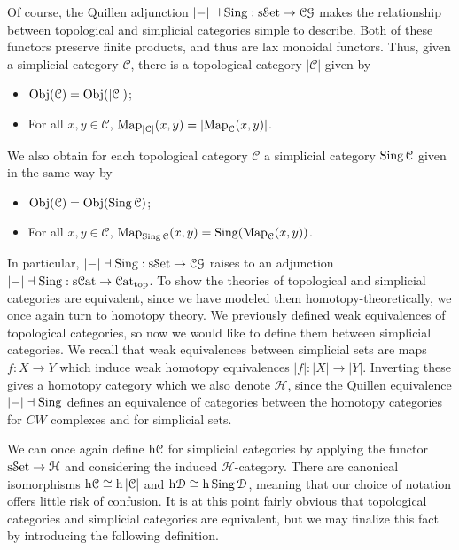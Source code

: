 Of course, the Quillen adjunction $\left| - \right| \dashv\operatorname{Sing} : \mathrm{s}\mathcal{S}\mathrm{et} \to \mathcal{C} \mathcal{G} $ makes the relationship between topological and simplicial categories simple to describe. Both of these functors preserve finite products, and thus are lax monoidal functors. Thus, given a simplicial category $\mathcal{C} $, there is a topological category $\left| \mathcal{C}  \right| $ given by
\begin{itemize}
	\item $\operatorname{Obj}(\mathcal{C} ) =\operatorname{Obj}(\left| \mathcal{C}  \right| ) $;
	\item For all $x,y\in \mathcal{C} $, $\operatorname{Map} _{\left| \mathcal{C}  \right| } (x,y)=\left| \operatorname{Map} _\mathcal{C} (x,y) \right| $.
\end{itemize}
We also obtain for each topological category $\mathcal{C} $ a simplicial category $\operatorname{Sing}\mathcal{C} $ given in the same way by
\begin{itemize}
	\item $\operatorname{Obj}(\mathcal{C} ) =\operatorname{Obj}(\operatorname{Sing} \mathcal{C} ) $;
	\item For all $x,y\in \mathcal{C} $, $\operatorname{Map} _{\operatorname{Sing} \mathcal{C} } (x,y)=\operatorname{Sing}(\operatorname{Map} _\mathcal{C} (x,y))$.
\end{itemize}
In particular, $\left| - \right| \dashv\operatorname{Sing} : \mathrm{s}\mathcal{S}\mathrm{et}  \to \mathcal{C} \mathcal{G} $ raises to an adjunction $\left| - \right| \dashv\operatorname{Sing} : \mathrm{s} \mathcal{C}\mathrm{at}  \to \mathcal{C}\mathrm{at} _{\text{top} } $. To show the theories of topological and simplicial categories are equivalent, since we have modeled them homotopy-theoretically, we once again turn to homotopy theory. We previously defined weak equivalences of topological categories, so now we would like to define them between simplicial categories. We recall that weak equivalences between simplicial sets are maps $f : X \to Y$ which induce weak homotopy equivalences $\left| f \right| : \left| X \right|  \to \left| Y \right| $. Inverting these gives a homotopy category which we also denote $\mathcal{H} $, since the Quillen equivalence $\left| - \right| \dashv\operatorname{Sing}$ defines an equivalence of categories between the homotopy categories for $CW$ complexes and for simplicial sets.

We can once again define $\mathrm{h}\mathcal{C} $ for simplicial categories by applying the functor $\mathrm{s}\mathcal{S}\mathrm{et} \to \mathcal{H} $ and considering the induced $\mathcal{H} $-category. There are canonical isomorphisms $\mathrm{h}\mathcal{C} \cong \mathrm{h}\left| \mathcal{C}  \right| $ and $\mathrm{h} \mathcal{D} \cong \mathrm{h}\operatorname{Sing} \mathcal{D} $, meaning that our choice of notation offers little risk of confusion. It is at this point fairly obvious that topological categories and simplicial categories are equivalent, but we may finalize this fact by introducing the following definition.

